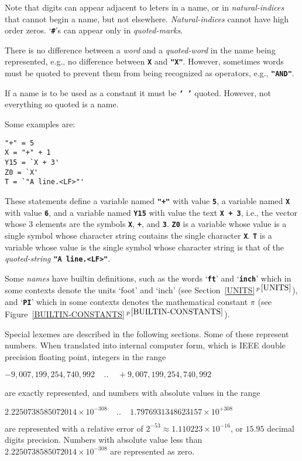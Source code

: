 \documentclass[12pt]{article}
\newcommand{\TT}[1]{{\tt \bfseries #1}}
\newcommand{\itemref}[1]{\ref{#1}$\,^{p\,\pageref{#1}}$}
\newenvironment{indpar}[1][0.3in]%
	{\begin{list}{}%
		     {\setlength{\itemsep}{0in}%
		      \setlength{\topsep}{0in}%
		      \setlength{\parsep}{1ex}%
		      \setlength{\labelwidth}{#1}%
		      \setlength{\leftmargin}{#1}%
		      \addtolength{\leftmargin}{\labelsep}}%
	 \item}%
	{\end{list}}
\begin{document}
Note that digits can appear adjacent to leters in a name, or in
{\em natural-indices} that cannot begin a name, but not
elsewhere.  {\em Natural-indices} cannot have high order
zeros.  `\TT{\#}'s can appear only in {\em quoted-marks}.

There is no difference between a {\em word} and a {\em quoted-word}
in the name being represented,
e.g., no difference between \TT{X} and \TT{"X"}.  However,
sometimes words must be quoted to prevent them from being recognized
as operators, e.g., \TT{"AND"}.

If a name is to be used as a constant it must be \TT{`~'} quoted.
However, not everything so quoted is a name.

Some examples are:

\begin{indpar}\begin{verbatim}
"+" = 5
X = "+" + 1
Y15 = `X + 3' 
Z0 = `X'
T = `"A line.<LF>"'
\end{verbatim}\end{indpar}

These statements define
a variable named \TT{"+"} with value \TT{5}, a variable
named \TT{X} with value \TT{6}, and
a variable named \TT{Y15} with value the text \TT{X + 3},
i.e., the vector whose 3 elements are the symbols
\TT{X}, \TT{+}, and \TT{3}.  \TT{Z0} is a variable whose
value is a single symbol whose character string contains
the single character \TT{X}.
\TT{T} is a variable whose value is the single symbol
whose character string is that of the {\em quoted-string} \TT{"A line.<LF>"}.

Some {\em names} have builtin definitions, such as the
words `\TT{ft}' and `\TT{inch}' which in some contexts denote the
units `foot' and `inch' (see Section~\itemref{UNITS}),
and `\TT{PI}' which in some contexts denotes the mathematical
constant $\pi$ (see Figure~\itemref{BUILTIN-CONSTANTS}).

Special lexemes are described in the following sections.  Some of these
represent numbers.  When translated into internal computer form,
which is IEEE double precision floating point,
integers in the range
\begin{center}
$-9,007,199,254,740,992~~~~~..~~~~~+9,007,199,254,740,992$
\end{center}
are exactly represented, and numbers with absolute values in the range
\begin{center}
$2.2250738585072014\times 10^{-308}~~~~~..~~~~~1.7976931348623157\times
                                                               10^{+308}$
\end{center}
are represented with a relative error of
$2^{-53} \approx 1.110223\times 10^{-16}$,
or $15.95$ decimal digits precision.  Numbers with absolute value less than
$2.2250738585072014\times 10^{-308}$ are represented as zero.
\end{document}
